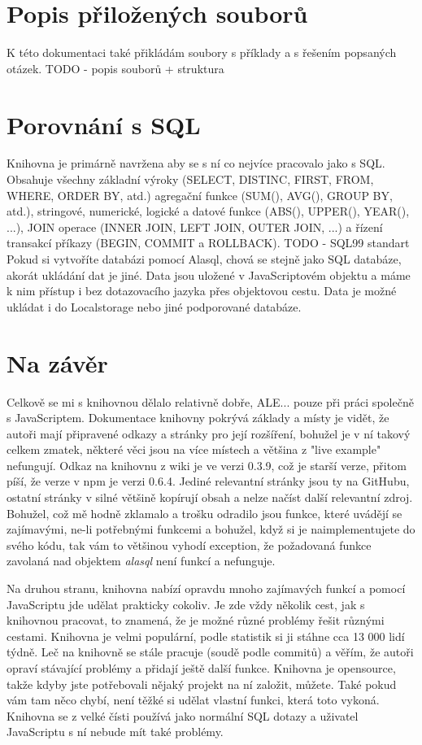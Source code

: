 \documentclass[a4, titlepage]{article}
\begin{document}
\section{Popis přiložených souborů}
K této dokumentaci také přikládám soubory s příklady a s řešením popsaných otázek.
TODO - popis souborů + struktura

\section{Porovnání s SQL}
Knihovna je primárně navržena aby se s ní co nejvíce pracovalo jako s SQL. Obsahuje všechny základní výroky (SELECT, DISTINC, FIRST, FROM, WHERE, ORDER BY, atd.) agregační funkce (SUM(), AVG(), GROUP BY, atd.), stringové, numerické, logické a datové funkce (ABS(), UPPER(), YEAR(), ...), JOIN operace (INNER JOIN, LEFT JOIN, OUTER JOIN, ...) a řízení transakcí příkazy (BEGIN, COMMIT a ROLLBACK). 
TODO - SQL99 standart
Pokud si vytvoříte databázi pomocí Alasql, chová se stejně jako SQL databáze, akorát ukládání dat je jiné. Data jsou uložené v JavaScriptovém objektu a máme k nim přístup i bez dotazovacího jazyka přes objektovou cestu. Data je možné ukládat i do Localstorage nebo jiné podporované databáze.

\section{Na závěr}
Celkově se mi s knihovnou dělalo relativně dobře, ALE... pouze při práci společně s JavaScriptem. Dokumentace knihovny pokrývá základy a místy je vidět, že autoři mají připravené odkazy a stránky pro její rozšíření, bohužel je v ní takový celkem zmatek, některé věci jsou na více místech a většina z "live example" nefungují. Odkaz na knihovnu z wiki je ve verzi 0.3.9, což je starší verze, přitom píší, že verze v npm je verzi 0.6.4. Jediné relevantní stránky jsou ty na GitHubu, ostatní stránky v silné většině kopírují obsah a nelze načíst další relevantní zdroj. Bohužel, což mě hodně zklamalo a trošku odradilo jsou funkce, které uvádějí se zajímavými, ne-li potřebnými funkcemi a bohužel, když si je naimplementujete do svého kódu, tak vám to většinou vyhodí exception, že požadovaná funkce zavolaná nad objektem \textit{alasql} není funkcí a nefunguje. 

Na druhou stranu, knihovna nabízí opravdu mnoho zajímavých funkcí a pomocí JavaScriptu jde udělat prakticky cokoliv. Je zde vždy několik cest, jak s knihovnou pracovat, to znamená, že je možné různé problémy řešit různými cestami. Knihovna je velmi populární, podle statistik si ji stáhne cca 13 000 lidí týdně. Leč na knihovně se stále pracuje (soudě podle commitů) a věřím, že autoři opraví stávající problémy a přidají ještě další funkce. Knihovna je opensource, takže kdyby jste potřebovali nějaký projekt na ní založit, můžete. Také pokud vám tam něco chybí, není těžké si udělat vlastní funkci, která toto vykoná. Knihovna se z velké čísti používá jako normální SQL dotazy a uživatel JavaScriptu s ní nebude mít také problémy.
\end{document}
